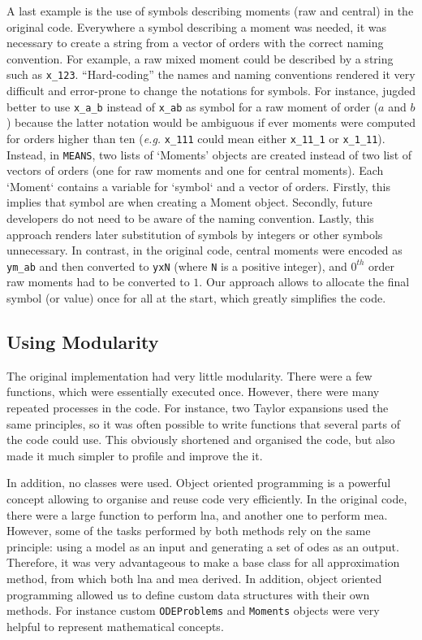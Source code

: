 \documentclass[11pt,a4paper]{article}
\newcommand{\means}{\texttt{MEANS}}
\newcommand{\eg}{\emph{e.g.}}
\begin{document}
A last example is the use of symbols describing moments (raw and central) in the original code.
Everywhere a symbol describing a moment was needed, it was necessary to create a string from a vector of orders with the correct naming convention.
For example, a raw mixed moment could be described by a string such as \verb"x_123".
``Hard-coding'' the names and naming conventions rendered it very difficult and error-prone to change the notations for symbols.
For instance, jugded better to use \verb"x_a_b" instead of \verb"x_ab" as symbol for a raw moment of order ($a$ and $b$)
because the latter notation would be ambiguous if ever moments were computed for orders higher than ten (\eg{} \verb"x_111" could mean either \verb"x_11_1"  or \verb"x_1_11").
Instead, in \means, two lists of `Moments' objects are created instead of two list of vectors of orders (one for raw moments and one for central moments).
Each `Moment` contains a variable for `symbol` and a vector of orders.
Firstly, this implies that symbol are when creating a Moment object.
Secondly, future developers do not need to be aware of the naming convention.
Lastly, this approach renders later substitution of symbols by integers or other symbols unnecessary.
In contrast, in the original code, central moments were encoded as \verb"ym_ab" and then
converted to \verb"yxN" (where \verb"N"  is a positive integer),
and $0^{th}$ order raw moments had to be converted to $1$.
Our approach allows to allocate the final symbol (or value) once for all at the start, which greatly simplifies the code.

\subsection{Using Modularity}

The original implementation had very little modularity.
There were a few functions, which were essentially executed once.
However, there were many repeated processes in the code.
For instance, two Taylor expansions used the same principles, 
so it was often possible to write functions that several parts of the code could use.
This obviously shortened and organised the code, but also made it much simpler to profile and improve the it.
 
In addition, no classes were used.
Object oriented programming is a powerful concept allowing to organise and reuse code very efficiently.
In the original code, there were a large function to perform \gls{lna}, and another one to perform \gls{mea}.
However, some of the tasks performed by both methods rely on the same principle: using a model as an input and generating a set of \glspl{ode} as an output.
Therefore, it was very advantageous to make a base class for all approximation method, from which both \gls{lna} and \gls{mea} derived.
In addition, object oriented programming allowed us to define custom data structures with their own methods.
For instance custom \texttt{ODEProblems} and \texttt{Moments} objects were very helpful to represent mathematical concepts.
\end{document}
